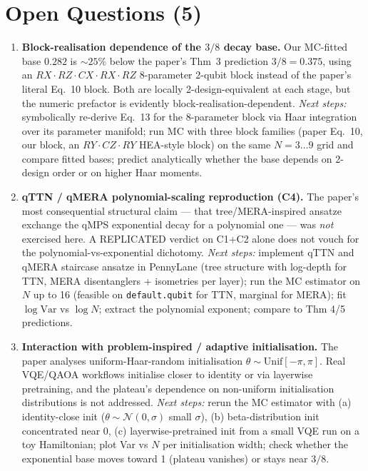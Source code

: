 \section{Open Questions (5)}

\begin{enumerate}

\item \textbf{Block-realisation dependence of the $3/8$ decay base.} Our MC-fitted base $0.282$ is $\sim 25\%$ below the paper's Thm~3 prediction $3/8 = 0.375$, using an $RX{\cdot}RZ{\cdot}CX{\cdot}RX{\cdot}RZ$ 8-parameter 2-qubit block instead of the paper's literal Eq.~10 block. Both are locally 2-design-equivalent at each stage, but the numeric prefactor is evidently block-realisation-dependent. \emph{Next steps:} symbolically re-derive Eq.~13 for the 8-parameter block via Haar integration over its parameter manifold; run MC with three block families (paper Eq.~10, our block, an $RY{\cdot}CZ{\cdot}RY$ HEA-style block) on the same $N=3\ldots 9$ grid and compare fitted bases; predict analytically whether the base depends on 2-design order or on higher Haar moments.

\item \textbf{qTTN / qMERA polynomial-scaling reproduction (C4).} The paper's most consequential structural claim --- that tree/MERA-inspired ansatze exchange the qMPS exponential decay for a polynomial one --- was \emph{not} exercised here. A REPLICATED verdict on C1+C2 alone does not vouch for the polynomial-vs-exponential dichotomy. \emph{Next steps:} implement qTTN and qMERA staircase ansatze in PennyLane (tree structure with log-depth for TTN, MERA disentanglers + isometries per layer); run the MC estimator on $N$ up to 16 (feasible on \texttt{default.qubit} for TTN, marginal for MERA); fit $\log\mathrm{Var}$ vs $\log N$; extract the polynomial exponent; compare to Thm 4/5 predictions.

\item \textbf{Interaction with problem-inspired / adaptive initialisation.} The paper analyses uniform-Haar-random initialisation $\theta \sim \mathrm{Unif}[-\pi,\pi]$. Real VQE/QAOA workflows initialise closer to identity or via layerwise pretraining, and the plateau's dependence on non-uniform initialisation distributions is not addressed. \emph{Next steps:} rerun the MC estimator with (a) identity-close init ($\theta \sim \mathcal{N}(0,\sigma)$ small $\sigma$), (b) beta-distribution init concentrated near 0, (c) layerwise-pretrained init from a small VQE run on a toy Hamiltonian; plot Var vs $N$ per initialisation width; check whether the exponential base moves toward 1 (plateau vanishes) or stays near $3/8$.


\end{enumerate}
